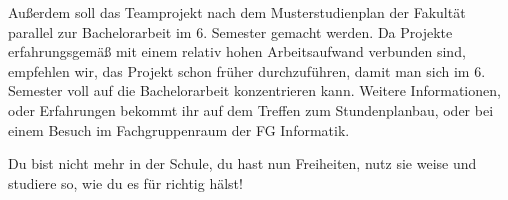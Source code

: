 Außerdem soll das Teamprojekt nach dem Musterstudienplan der Fakultät parallel zur Bachelorarbeit im 6. Semester gemacht werden. Da Projekte erfahrungsgemäß mit einem relativ hohen Arbeitsaufwand verbunden sind, empfehlen wir, das Projekt schon früher durchzuführen, damit man sich im 6. Semester voll auf die Bachelorarbeit konzentrieren kann. Weitere Informationen, oder Erfahrungen bekommt ihr auf dem Treffen zum Stundenplanbau, oder bei einem Besuch im Fachgruppenraum der FG Informatik.



Du bist nicht mehr in der Schule, du hast nun Freiheiten, nutz sie weise und studiere so, wie du es für richtig hälst!
